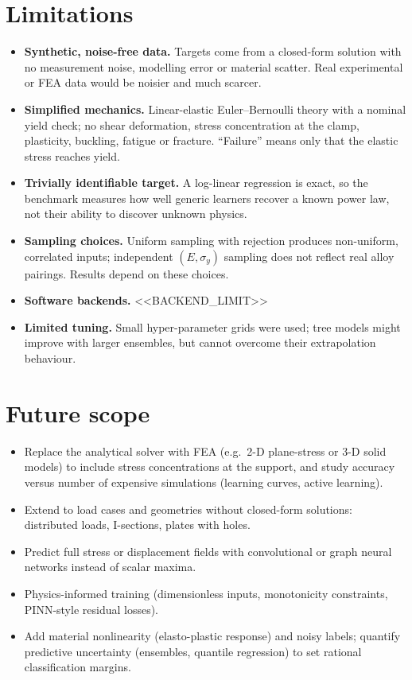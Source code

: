 \documentclass[11pt,a4paper]{article}
\begin{document}
\section{Limitations}
\begin{itemize}
\item \textbf{Synthetic, noise-free data.} Targets come from a closed-form solution with no measurement noise, modelling
error or material scatter. Real experimental or FEA data would be noisier and much scarcer.
\item \textbf{Simplified mechanics.} Linear-elastic Euler--Bernoulli theory with a nominal yield check; no shear
deformation, stress concentration at the clamp, plasticity, buckling, fatigue or fracture. ``Failure'' means only that
the elastic stress reaches yield.
\item \textbf{Trivially identifiable target.} A log-linear regression is exact, so the benchmark measures how well generic
learners recover a known power law, not their ability to discover unknown physics.
\item \textbf{Sampling choices.} Uniform sampling with rejection produces non-uniform, correlated inputs; independent
$(E,\sigma_y)$ sampling does not reflect real alloy pairings. Results depend on these choices.
\item \textbf{Software backends.} <<BACKEND_LIMIT>>
\item \textbf{Limited tuning.} Small hyper-parameter grids were used; tree models might improve with larger ensembles,
but cannot overcome their extrapolation behaviour.
\end{itemize}

\section{Future scope}
\begin{itemize}
\item Replace the analytical solver with FEA (e.g.\ 2-D plane-stress or 3-D solid models) to include stress concentrations
at the support, and study accuracy versus number of expensive simulations (learning curves, active learning).
\item Extend to load cases and geometries without closed-form solutions: distributed loads, I-sections, plates with holes.
\item Predict full stress or displacement fields with convolutional or graph neural networks instead of scalar maxima.
\item Physics-informed training (dimensionless inputs, monotonicity constraints, PINN-style residual losses).
\item Add material nonlinearity (elasto-plastic response) and noisy labels; quantify predictive uncertainty
(ensembles, quantile regression) to set rational classification margins.
\end{itemize}
\end{document}
